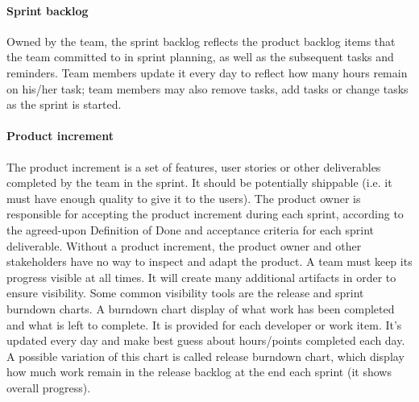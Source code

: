 \paragraph{Sprint backlog} Owned by the team, the sprint backlog reflects the product backlog items that the team committed to in sprint planning, as well as the subsequent tasks and reminders. Team members update it every day to reflect how many hours remain on his/her task; team members may also remove tasks, add tasks or change tasks as the sprint is started.
\paragraph{Product increment} The product increment is a set of features, user stories or other deliverables completed by the team in the sprint. It should be potentially shippable (i.e. it must have enough quality to give it to the users). The product owner is responsible for accepting the product increment during each sprint, according to the agreed-upon Definition of Done and acceptance criteria for each sprint deliverable. Without a product increment, the product owner and other stakeholders have no way to inspect and adapt the product. A team must keep its progress visible at all times. It will create many additional artifacts in order to ensure visibility. Some common visibility tools are the release and sprint burndown charts. A burndown chart display of what work has been completed and what is left to complete. It is provided for each developer or work item. It's updated every day and make best guess about hours/points completed each day. A possible variation of this chart is called release burndown chart, which display how much work remain in the release backlog at the end each sprint (it shows overall progress).

